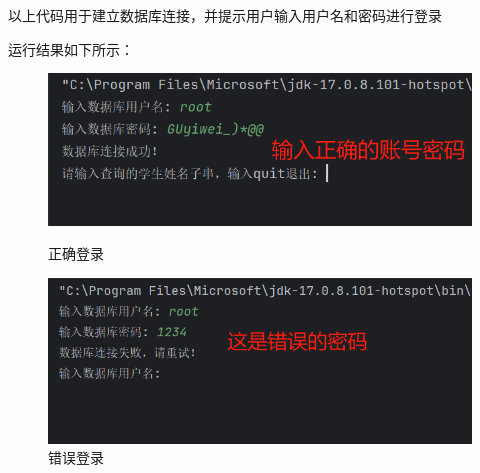 \documentclass{article}
\begin{document}
	以上代码用于建立数据库连接，并提示用户输入用户名和密码进行登录
	
	运行结果如下所示：
	
	\begin{figure}[H]
		\centering
		\begin{minipage}[b]{0.45\textwidth}
			\includegraphics[width=\textwidth]{./images/16.正确登录.png}
			\caption{正确登录}
		\end{minipage}
		\hfill
		\begin{minipage}[b]{0.45\textwidth}
			\includegraphics[width=\textwidth]{./images/17.错误登录.png}
			\caption{错误登录}
		\end{minipage}
	\end{figure}
	
\end{document}
